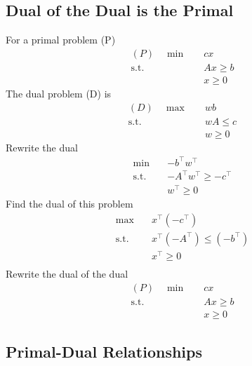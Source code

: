 				\subsection{Dual of the Dual is the Primal}
					For a primal problem (P)
					\begin{align}
						(P) \quad \min \quad & cx \\
								\text{s.t.} \quad & Ax \ge b \\
												  & x \ge 0 
					\end{align}
					The dual problem (D) is 
					\begin{align}
						(D) \quad \max \quad & wb \\
								\text{s.t.} \quad & wA \le c \\
												  & w \ge 0 
					\end{align}
					Rewrite the dual
					\begin{align}
						\min \quad & -b^\top w^\top  \\
						\text{s.t.} \quad & -A^\top w^\top  \ge -c^\top  \\
										  & w^\top  \ge 0 
					\end{align}
					Find the dual of this problem
					\begin{align}
						\max \quad & x^\top (-c^\top )\\
						\text{s.t.} \quad & x^\top (-A^\top ) \le (-b^\top ) \\
										  & x^\top  \ge 0 \\
					\end{align}
					Rewrite the dual of the dual
					\begin{align}
						(P) \quad \min \quad & cx \\
								\text{s.t.} \quad & Ax \ge b \\
												  & x \ge 0 
					\end{align}

				\subsection{Primal-Dual Relationships}
